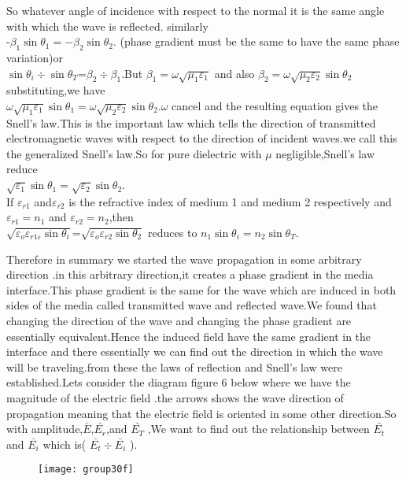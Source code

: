 So whatever angle of incidence with respect to the normal it is the same angle with which the wave is reflected.
similarly\\-$\beta_1\sin\theta_1=-\beta_2\sin\theta_2$. (phase gradient must be the same to have the same phase variation)or\\ $\sin\theta_i\div\sin\theta_T$=$\beta_2\div\beta_1$.But $\beta_1=\omega\sqrt{\mu_1\varepsilon_1}$ and also $\beta_2=\omega\sqrt{\mu_2\varepsilon_2}\sin\theta_2$ substituting,we have\\ $\omega\sqrt{\mu_1\varepsilon_1}\sin \theta_1=\omega\sqrt{\mu_2\varepsilon_2}\sin\theta_2$.$\omega$ cancel and the resulting equation gives the Snell's law.This is the important law which tells the direction of transmitted electromagnetic waves with respect to the direction of incident waves.we call this the generalized Snell's law.So for pure dielectric with $\mu$ negligible,Snell's law reduce\\ $\sqrt{\varepsilon_1}\sin\theta_1=\sqrt{\varepsilon_2}\sin\theta_2$.\\If $\varepsilon_{r1}$ and$ \varepsilon_{r2}$ is the refractive index of medium 1 and medium 2 respectively and $\varepsilon_{r1}=n_1$ and $\varepsilon_{r2}=n_2$,then\\ $\sqrt{\varepsilon_o\varepsilon_{r1\varepsilon}\sin\theta_i}$=$\sqrt{\varepsilon_o\varepsilon_{r2}\sin\theta_2}$ reduces to $n_1\sin\theta_i=n_2\sin\theta_T$.

Therefore in summary we started the wave propagation in some arbitrary direction .in this arbitrary direction,it creates a phase gradient in the media interface.This phase gradient is the same for the wave which are induced in both sides of the media called transmitted wave and reflected wave.We found that changing the direction of the wave and changing the phase gradient are essentially equivalent.Hence the induced field have the same gradient in the interface and there essentially we can find out the direction in which the wave will be traveling.from these the laws of reflection and Snell's law were established.Lets consider the diagram figure 6 below
where we have the magnitude of  the electric field .the arrows shows the wave direction of  propagation meaning that the electric field is oriented in some other direction.So with amplitude,$\bar{E}$,$\bar{E_r}$,and $\bar{E_T}$ ,We want to find out the relationship between $\bar{E_t}$ and $\bar{E_i}$ which is( $\bar{E_t}\div\bar{E_i}$ ).
\begin{figure}
\centering
\texttt{[image: group30f]}
\caption{}
\label{fig:group30f}
\end{figure}

